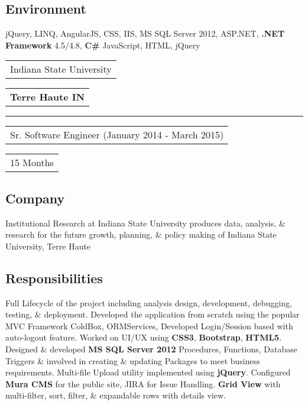 \documentclass[letterpaper,11pt]{article}
\begin{document}
    \subsection{Environment}
    jQuery, LINQ, AngularJS, CSS, IIS, MS SQL Server 2012, ASP.NET, \textbf{\color{darkgray}.NET Framework} 4.5/4.8, \textbf{\color{darkgray}C\#} JavaScript, HTML, jQuery



    \vspace{1.27cm}
    \noindent
    \begin{tabular}[t]{@{}l}
    \Large{Indiana State University}
    \end{tabular}
    \hfill
    \begin{tabular}[t]{l@{}}
    \textbf{\color{darkgray}Terre Haute IN}
    \end{tabular}
    \noindent\rule{\textwidth}{0.5pt}
    \begin{tabular}[t]{@{}l}
    Sr. Software Engineer (January 2014 - March 2015)
    \end{tabular}
    \hfill
    \begin{tabular}[t]{l@{}}
    15 Months
    \end{tabular}

    \subsection{Company}
    Institutional Research at Indiana State University produces data, analysis, \& research for the future growth, planning, \& policy making of Indiana State University, Terre Haute

    \subsection{Responsibilities}
    Full Lifecycle of the project including analysis design, development, debugging, testing, \& deployment. Developed the application from scratch using the popular MVC Framework ColdBox, ORMServices, Developed Login/Session based with auto-logout feature. Worked on UI/UX using \textbf{\color{darkgray}CSS3}, \textbf{\color{darkgray}Bootstrap}, \textbf{\color{darkgray}HTML5}. Designed \& developed \textbf{\color{darkgray}MS SQL Server 2012} Procedures, Functions, Database Triggers \& involved in creating \& updating Packages to meet business requirements. Multi-file Upload utility implemented using \textbf{\color{darkgray}jQuery}. Configured \textbf{\color{darkgray}Mura CMS} for the public site, JIRA for Issue Handling. \textbf{\color{darkgray}Grid View} with multi-filter, sort, filter, \& expandable rows with details view.
\end{document}
